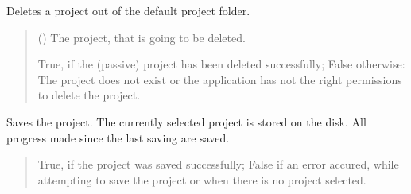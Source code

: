\documentclass[letterpaper,10pt,english]{sphinxmanual}
\begin{document}
\begin{fulllineitems}
\begin{fulllineitems}
\begin{quote}
\begin{description}
\end{description}\end{quote}

\end{fulllineitems}


\begin{fulllineitems}
\label{\detokenize{apidoc/src.osm_configurator.control:src.osm_configurator.control.control.Control.delete_passive_project}}
\pysigstartsignatures
{}
\pysigstopsignatures
\sphinxAtStartPar
Deletes a project out of the default project folder.
\begin{quote}\begin{description}
\sphinxAtStartPar
{} ({\hyperref[\detokenize{apidoc/src.osm_configurator.model.application:src.osm_configurator.model.application.passive_project.PassiveProject}]{}}) \textendash{} The project, that is going to be deleted.

\sphinxAtStartPar
True, if the (passive) project has been deleted successfully; False otherwise: The project does not exist or the application has not the right permissions to delete the project.

\sphinxAtStartPar
{}

\end{description}\end{quote}

\end{fulllineitems}


\begin{fulllineitems}
\label{\detokenize{apidoc/src.osm_configurator.control:src.osm_configurator.control.control.Control.save_project}}
\pysigstartsignatures
{}
\pysigstopsignatures
\sphinxAtStartPar
Saves the project.
The currently selected project is stored on the disk. All progress made since the last saving are saved.
\begin{quote}\begin{description}
\sphinxAtStartPar
True, if the project was saved successfully; False if an error accured, while attempting to save the project or when there is no project selected.


\end{description}
\end{quote}
\end{fulllineitems}
\end{fulllineitems}
\end{document}
